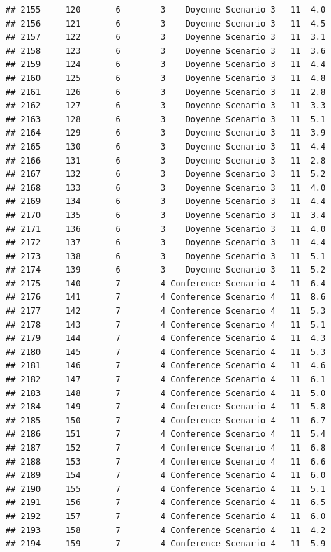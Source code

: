 \documentclass[
]{article}
\begin{document}
\begin{verbatim}
## 2155     120       6        3    Doyenne Scenario 3   11  4.0
## 2156     121       6        3    Doyenne Scenario 3   11  4.5
## 2157     122       6        3    Doyenne Scenario 3   11  3.1
## 2158     123       6        3    Doyenne Scenario 3   11  3.6
## 2159     124       6        3    Doyenne Scenario 3   11  4.4
## 2160     125       6        3    Doyenne Scenario 3   11  4.8
## 2161     126       6        3    Doyenne Scenario 3   11  2.8
## 2162     127       6        3    Doyenne Scenario 3   11  3.3
## 2163     128       6        3    Doyenne Scenario 3   11  5.1
## 2164     129       6        3    Doyenne Scenario 3   11  3.9
## 2165     130       6        3    Doyenne Scenario 3   11  4.4
## 2166     131       6        3    Doyenne Scenario 3   11  2.8
## 2167     132       6        3    Doyenne Scenario 3   11  5.2
## 2168     133       6        3    Doyenne Scenario 3   11  4.0
## 2169     134       6        3    Doyenne Scenario 3   11  4.4
## 2170     135       6        3    Doyenne Scenario 3   11  3.4
## 2171     136       6        3    Doyenne Scenario 3   11  4.0
## 2172     137       6        3    Doyenne Scenario 3   11  4.4
## 2173     138       6        3    Doyenne Scenario 3   11  5.1
## 2174     139       6        3    Doyenne Scenario 3   11  5.2
## 2175     140       7        4 Conference Scenario 4   11  6.4
## 2176     141       7        4 Conference Scenario 4   11  8.6
## 2177     142       7        4 Conference Scenario 4   11  5.3
## 2178     143       7        4 Conference Scenario 4   11  5.1
## 2179     144       7        4 Conference Scenario 4   11  4.3
## 2180     145       7        4 Conference Scenario 4   11  5.3
## 2181     146       7        4 Conference Scenario 4   11  4.6
## 2182     147       7        4 Conference Scenario 4   11  6.1
## 2183     148       7        4 Conference Scenario 4   11  5.0
## 2184     149       7        4 Conference Scenario 4   11  5.8
## 2185     150       7        4 Conference Scenario 4   11  6.7
## 2186     151       7        4 Conference Scenario 4   11  5.4
## 2187     152       7        4 Conference Scenario 4   11  6.8
## 2188     153       7        4 Conference Scenario 4   11  6.6
## 2189     154       7        4 Conference Scenario 4   11  6.0
## 2190     155       7        4 Conference Scenario 4   11  5.1
## 2191     156       7        4 Conference Scenario 4   11  6.5
## 2192     157       7        4 Conference Scenario 4   11  6.0
## 2193     158       7        4 Conference Scenario 4   11  4.2
## 2194     159       7        4 Conference Scenario 4   11  5.9

\end{verbatim}
\end{document}
